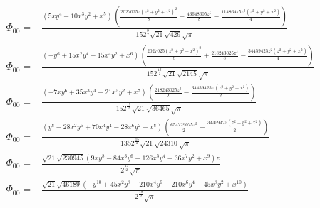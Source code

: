 \documentclass[10pt]{article}
\begin{document}
\begin{align*}
\Phi_{00} = &\frac{\left( 5 x {{y}^{4}}-10 {{x}^{3}} {{y}^{2}}+{{x}^{5}}\right) \, \left( \frac{2027025 z {{\left( {{z}^{2}}+{{y}^{2}}+{{x}^{2}}\right) }^{2}}}{8}+\frac{43648605 {{z}^{5}}}{8}-\frac{11486475 {{z}^{3}} \left( {{z}^{2}}+{{y}^{2}}+{{x}^{2}}\right) }{4}\right) }{15 {{2}^{\frac{9}{2}}} \sqrt{21} \sqrt{429} \sqrt{\ensuremath{\pi} }} \\
\Phi_{00} = &\frac{\left( -{{y}^{6}}+15 {{x}^{2}} {{y}^{4}}-15 {{x}^{4}} {{y}^{2}}+{{x}^{6}}\right) \, \left( \frac{2027025 {{\left( {{z}^{2}}+{{y}^{2}}+{{x}^{2}}\right) }^{2}}}{8}+\frac{218243025 {{z}^{4}}}{8}-\frac{34459425 {{z}^{2}} \left( {{z}^{2}}+{{y}^{2}}+{{x}^{2}}\right) }{4}\right) }{15 {{2}^{\frac{13}{2}}} \sqrt{21} \sqrt{2145} \sqrt{\ensuremath{\pi} }} \\
\Phi_{00} = &\frac{\left( -7 x {{y}^{6}}+35 {{x}^{3}} {{y}^{4}}-21 {{x}^{5}} {{y}^{2}}+{{x}^{7}}\right) \, \left( \frac{218243025 {{z}^{3}}}{2}-\frac{34459425 z\, \left( {{z}^{2}}+{{y}^{2}}+{{x}^{2}}\right) }{2}\right) }{15 {{2}^{\frac{15}{2}}} \sqrt{21} \sqrt{36465} \sqrt{\ensuremath{\pi} }} \\
\Phi_{00} = &\frac{\left( {{y}^{8}}-28 {{x}^{2}} {{y}^{6}}+70 {{x}^{4}} {{y}^{4}}-28 {{x}^{6}} {{y}^{2}}+{{x}^{8}}\right) \, \left( \frac{654729075 {{z}^{2}}}{2}-\frac{34459425 \left( {{z}^{2}}+{{y}^{2}}+{{x}^{2}}\right) }{2}\right) }{135 {{2}^{\frac{15}{2}}} \sqrt{21} \sqrt{24310} \sqrt{\ensuremath{\pi} }} \\
\Phi_{00} = &\frac{\sqrt{21} \sqrt{230945} \left( 9 x {{y}^{8}}-84 {{x}^{3}} {{y}^{6}}+126 {{x}^{5}} {{y}^{4}}-36 {{x}^{7}} {{y}^{2}}+{{x}^{9}}\right)  z}{{{2}^{\frac{17}{2}}} \sqrt{\ensuremath{\pi} }}\\
\Phi_{00} = &\frac{\sqrt{21} \sqrt{46189} \left( -{{y}^{10}}+45 {{x}^{2}} {{y}^{8}}-210 {{x}^{4}} {{y}^{6}}+210 {{x}^{6}} {{y}^{4}}-45 {{x}^{8}} {{y}^{2}}+{{x}^{10}}\right) }{{{2}^{\frac{19}{2}}} \sqrt{\ensuremath{\pi} }}
\end{align*}
\end{document}

